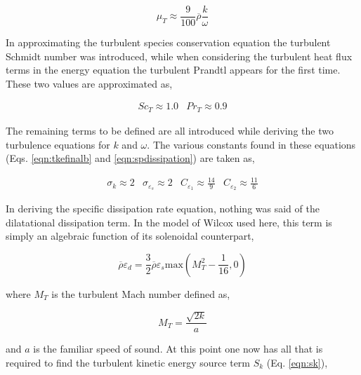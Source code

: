 \begin{equation}
	\mu_T \approx \frac{9}{100}\overline{\rho}\frac{k}{\omega}
\label{eqn:mut}
\end{equation}

	In approximating the turbulent species conservation equation the turbulent Schmidt number was introduced, while 
when considering the turbulent heat flux terms in the energy equation the turbulent Prandtl appears for the first time.  
These two values are approximated as,

\begin{equation}
	\begin{array}{cc}
	Sc_T \approx 1.0 & Pr_T \approx 0.9
	\end{array}
\label{eqn:sctandprt}
\end{equation}

	The remaining terms to be defined are all introduced while deriving the two turbulence equations for $k$ and 
$\omega$.  The various constants found in these equations (Eqs. \ref{eqn:tkefinalb} and \ref{eqn:spdissipation})
are taken as,

\begin{equation}
	\begin{array}{cccc}
	\sigma_k \approx 2 & \sigma_{\varepsilon_s} \approx 2 & C_{\varepsilon_1} \approx \frac{14}{9} & 
	C_{\varepsilon_2} \approx \frac{11}{6}
	\end{array}
\label{eqn:turbconstants}
\end{equation}

	In deriving the specific dissipation rate equation, nothing was said of the dilatational dissipation term.  In
the model of Wilcox used here, this term is simply an algebraic function of its solenoidal counterpart,

\begin{equation}
	\overline{\rho}\varepsilon_d = \frac{3}{2}\overline{\rho}\varepsilon_s \textrm{max}(M^2_T - \frac{1}{16},0)
\label{eqn:dildissipation}
\end{equation}

	where $M_T$ is the turbulent Mach number defined as,

\begin{equation}
	M_T = \frac{\sqrt{2k}}{a}
\label{eqn:turbmach}
\end{equation}

	and $a$ is the familiar speed of sound.  At this point one now has all that is required to find the
turbulent kinetic energy source term $S_k$ (Eq. \ref{eqn:sk}),

